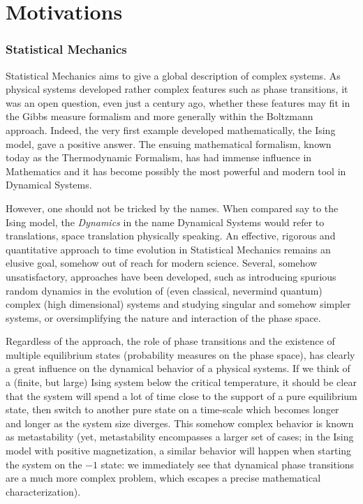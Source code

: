 \documentclass[reqno]{amsart}
\newcounter{as}[section]
\newcommand{\<}{\langle}
\renewcommand{\>}{\rangle}
\begin{document}
\section{Motivations}
\subsubsection*{Statistical Mechanics} Statistical Mechanics aims to give a global description of complex systems. As physical systems developed rather complex features such as phase transitions, it was an open question, even just a century ago, whether these features may fit in the Gibbs measure formalism and more generally within the Boltzmann approach. Indeed, the very first example developed mathematically, the Ising model, gave a positive answer. The ensuing mathematical formalism, known today as the Thermodynamic Formalism, has had immense influence in Mathematics and it has become possibly the most powerful and modern tool in Dynamical Systems.

However, one should not be tricked by the names. When compared say to the Ising model, the \emph{Dynamics} in the name Dynamical Systems would refer to translations, space translation physically speaking. An effective, rigorous and quantitative approach to time evolution in Statistical Mechanics remains an elusive goal, somehow out of reach for modern science. Several, somehow unsatisfactory, approaches have been developed, such as introducing spurious random dynamics in the evolution of (even classical, nevermind quantum) complex (high dimensional) systems and studying singular and somehow simpler systems, or oversimplifying the nature and interaction of the phase space.

Regardless of the approach, the role of phase transitions and the existence of multiple equilibrium states (probability measures on the phase space), has clearly a great influence on the dynamical behavior of a physical systems. If we think of a (finite, but large) Ising system below the critical temperature, it should be clear that the system will spend a lot of time close to the support of a pure equilibrium state, then switch to another pure state on a time-scale which becomes longer and longer as the system size diverges. This somehow complex behavior is known as metastability (yet, metastability encompasses a larger set of cases; in the Ising model with positive magnetization, a similar behavior will happen when starting the system on the $-1$ state: we immediately see that dynamical phase transitions are a much more complex problem, which escapes a precise mathematical characterization). 
\end{document}
